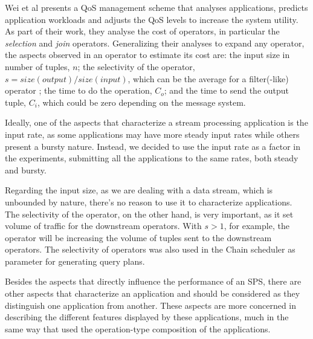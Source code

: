 \documentclass[ppgc,diss,english]{iiufrgs}
\begin{document}
Wei et al \cite{wei2006prediction} presents a QoS management scheme that analyses applications, predicts application workloads and adjusts the QoS levels to increase the system utility. As part of their work, they analyse the cost of operators, in particular the \emph{selection} and \emph{join} operators. Generalizing their analyses to expand any operator, the aspects observed in an operator to estimate its cost are: the input size in number of tuples, $n$; the selectivity of the operator, $s = size(output)/size(input)$, which can be the average for a filter(-like) operator \cite{babcock2004operator}; the time to do the operation, $C_{o}$; and the time to send the output tuple, $C_{i}$, which could be zero depending on the message system.

Ideally, one of the aspects that characterize a stream processing application is the input rate, as some applications may have more steady input rates while others present a bursty nature. Instead, we decided to use the input rate as a factor in the experiments, submitting all the applications to the same rates, both steady and bursty.

Regarding the input size, as we are dealing with a data stream, which is unbounded by nature, there's no reason to use it to characterize applications. The selectivity of the operator, on the other hand, is very important, as it set volume of traffic for the downstream operators. With $s > 1$, for example, the operator will be increasing the volume of tuples sent to the downstream operators. The selectivity of operators was also used in the Chain scheduler \cite{babcock2003chain} as parameter for generating query plans.



Besides the aspects that directly influence the performance of an SPS, there are other aspects that characterize an application and should be considered as they distinguish one application from another. These aspects are more concerned in describing the different features displayed by these applications, much in the same way that \cite{balaprakash2013exascale} used the operation-type composition of the applications.
\end{document}
